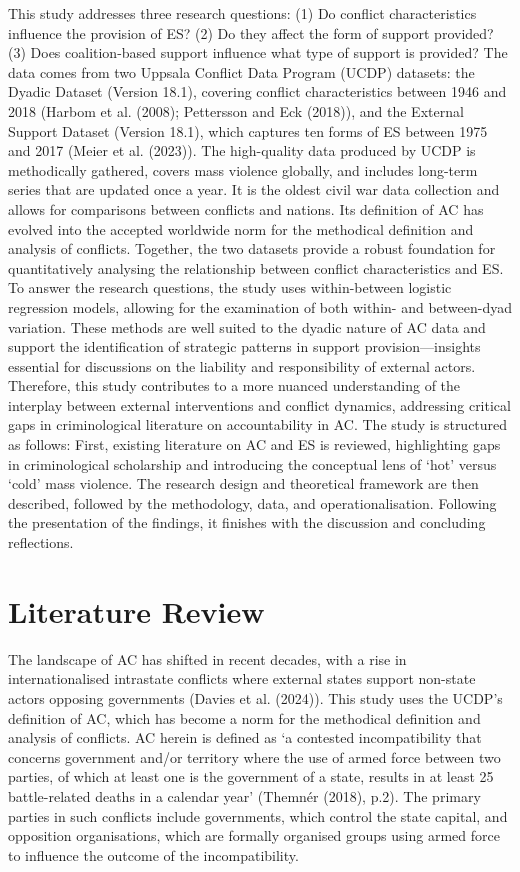 \documentclass[
]{article}
\begin{document}
This study addresses three research questions: (1) Do conflict
characteristics influence the provision of ES? (2) Do they affect the
form of support provided? (3) Does coalition-based support influence
what type of support is provided? The data comes from two Uppsala
Conflict Data Program (UCDP) datasets: the Dyadic Dataset (Version
18.1), covering conflict characteristics between 1946 and 2018 (Harbom
et al. (2008); Pettersson and Eck (2018)), and the External Support
Dataset (Version 18.1), which captures ten forms of ES between 1975 and
2017 (Meier et al. (2023)). The high-quality data produced by UCDP is
methodically gathered, covers mass violence globally, and includes
long-term series that are updated once a year. It is the oldest civil
war data collection and allows for comparisons between conflicts and
nations. Its definition of AC has evolved into the accepted worldwide
norm for the methodical definition and analysis of conflicts. Together,
the two datasets provide a robust foundation for quantitatively
analysing the relationship between conflict characteristics and ES. To
answer the research questions, the study uses within-between logistic
regression models, allowing for the examination of both within- and
between-dyad variation. These methods are well suited to the dyadic
nature of AC data and support the identification of strategic patterns
in support provision---insights essential for discussions on the
liability and responsibility of external actors. Therefore, this study
contributes to a more nuanced understanding of the interplay between
external interventions and conflict dynamics, addressing critical gaps
in criminological literature on accountability in AC. The study is
structured as follows: First, existing literature on AC and ES is
reviewed, highlighting gaps in criminological scholarship and
introducing the conceptual lens of `hot' versus `cold' mass violence.
The research design and theoretical framework are then described,
followed by the methodology, data, and operationalisation. Following the
presentation of the findings, it finishes with the discussion and
concluding reflections.

\section{Literature Review}\label{literature-review}

The landscape of AC has shifted in recent decades, with a rise in
internationalised intrastate conflicts where external states support
non-state actors opposing governments (Davies et al. (2024)). This study
uses the UCDP's definition of AC, which has become a norm for the
methodical definition and analysis of conflicts. AC herein is defined as
`a contested incompatibility that concerns government and/or territory
where the use of armed force between two parties, of which at least one
is the government of a state, results in at least 25 battle-related
deaths in a calendar year' (Themnér (2018), p.2). The primary parties in
such conflicts include governments, which control the state capital, and
opposition organisations, which are formally organised groups using
armed force to influence the outcome of the incompatibility.
\end{document}
